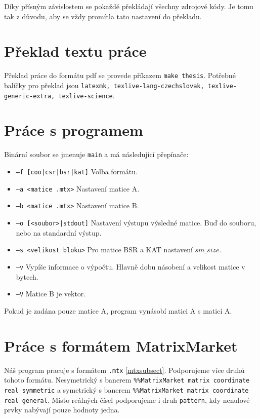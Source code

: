 \documentclass[thesis=B,czech]{FITthesis}[2012/06/26]
\begin{document}
Díky přísným závislostem se pokaždé překládají všechny zdrojové kódy. Je tomu tak z důvodu, aby se vždy promítla tato nastavení do překladu.

\section{Překlad textu práce}

Překlad práce do formátu pdf se provede příkazem \texttt{make thesis}. Potřebné balíčky pro překlad jsou \texttt{latexmk, texlive-lang-czechslovak, texlive-generic-extra, texlive-science}.

\section{Práce s programem}

Binární soubor se jmenuje \texttt{main} a má následující přepínače:

\begin{itemize}
	\item \texttt{--f [coo|csr|bsr|kat]} Volba formátu.
	\item \texttt{--a <matice .mtx>} Nastavení matice A.
	\item \texttt{--b <matice .mtx>} Nastavení matice B.
	\item \texttt{--o [<soubor>|stdout]} Nastavení výstupu výsledné matice. Buď do souboru, nebo na standardní výstup.
	\item \texttt{--s <velikost bloku>} Pro matice BSR a KAT nastavení $sm\_size$.
	\item \texttt{--v} Vypíše informace o výpočtu. Hlavně dobu násobení a velikost matice v bytech.
	\item \texttt{--V} Matice B je vektor.
\end{itemize}

Pokud je zadána pouze matice A, program vynásobí matici A s maticí A.

\section{Práce s formátem MatrixMarket}
\label{MM}

Náš program pracuje s formátem \texttt{.mtx} \ref{mtxsubsect}. Podporujeme více druhů tohoto formátu. Nesymetrický s banerem \texttt{\%\%MatrixMarket matrix coordinate real symmetric} a symetrický s banerem \texttt{\%\%MatrixMarket matrix coordinate real general}. Místo reálných čísel podporujeme i druh \texttt{pattern}, kdy nenulové prvky nabývají pouze hodnoty jedna.
\end{document}
